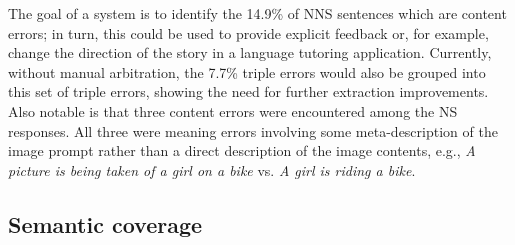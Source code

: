 The goal of a system is to identify the 14.9\% of NNS sentences
which are content errors; in turn, this could be used to provide explicit feedback or, for example, change the direction of the story in a language tutoring application.  Currently, without manual arbitration, the 7.7\% triple errors would also be grouped into this set of triple errors, showing
the need for further extraction improvements.  Also notable is that
three content errors were encountered among the NS responses. All
three were meaning errors involving some meta-description of the image
prompt rather than a direct description of the image contents, e.g.,
\textit{A picture is being taken of a girl on a bike} vs. \textit{A
  girl is riding a bike}.

\subsection{Semantic coverage}
\label{sec:eval:coverage}

